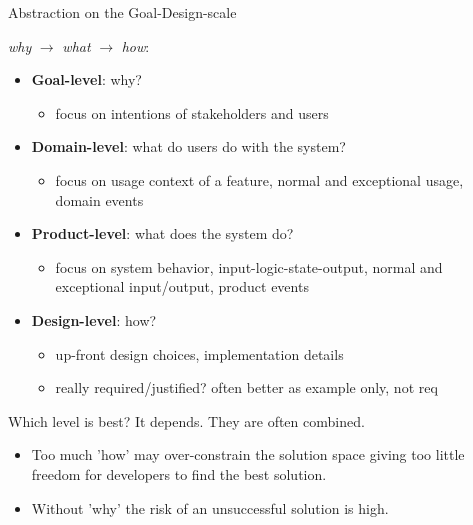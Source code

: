 \begin{Slide}{Abstraction on the Goal-Design-scale}

\textit{why} $\rightarrow$ \textit{what} $\rightarrow$  \textit{how}:
\begin{itemize}
\item \textbf{Goal-level}: why? 
\begin{itemize}
\item focus on intentions of stakeholders and users
\end{itemize}
\item \textbf{Domain-level}: what do users do with the system?
\begin{itemize}
\item focus on usage context of a feature, normal and exceptional usage, domain events
\end{itemize}
\item \textbf{Product-level}: what does the system do?
\begin{itemize}
\item focus on system behavior, input-logic-state-output, normal and exceptional input/output, product events
\end{itemize}
\item \textbf{Design-level}: how? 
\begin{itemize}
\item up-front design choices, implementation details
\item really required/justified? often better as example only, not req

\end{itemize}
\end{itemize}
Which level is best? It depends. They are often combined.
\begin{itemize}
\item Too much 'how' may over-constrain the solution space giving too little freedom for developers to find the best solution.  
\item Without 'why' the risk of an unsuccessful solution is high.

\end{itemize}
\end{Slide}